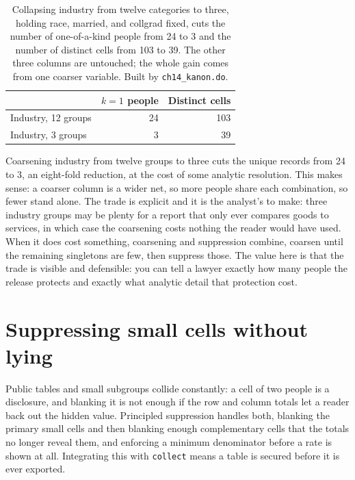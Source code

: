 \documentclass[
    a4paper,
    fontsize=10pt,
    twoside=true,
    numbers=noenddot,
]{kaobook}
\begin{document}
\begin{table}[htbp]
\centering
{\footnotesize
\begin{tabular}{lrr}
\hline
                       & $k=1$ people & Distinct cells \\
\hline
Industry, 12 groups    & 24 & 103 \\
Industry, 3 groups     &  3 &  39 \\
\hline
\end{tabular}
}
\caption[Coarsening industry collapses unique records]{Collapsing industry from twelve categories to three, holding race, married, and collgrad fixed, cuts the number of one-of-a-kind people from 24 to 3 and the number of distinct cells from 103 to 39. The other three columns are untouched; the whole gain comes from one coarser variable. Built by \texttt{ch14\_kanon.do}.}
\label{tab:coarsen}
\end{table}

Coarsening industry from twelve groups to three cuts the unique records from 24 to 3, an eight-fold reduction, at the cost of some analytic resolution. This makes sense: a coarser column is a wider net, so more people share each combination, so fewer stand alone. The trade is explicit and it is the analyst's to make: three industry groups may be plenty for a report that only ever compares goods to services, in which case the coarsening costs nothing the reader would have used. When it does cost something, coarsening and suppression combine, coarsen until the remaining singletons are few, then suppress those. The value here is that the trade is visible and defensible: you can tell a lawyer exactly how many people the release protects and exactly what analytic detail that protection cost.

\section{Suppressing small cells without lying}\label{sec:suppress}
Public tables and small subgroups collide constantly: a cell of two people is a disclosure, and blanking it is not enough if the row and column totals let a reader back out the hidden value. Principled suppression handles both, blanking the primary small cells and then blanking enough complementary cells that the totals no longer reveal them, and enforcing a minimum denominator before a rate is shown at all. Integrating this with \texttt{collect} means a table is secured before it is ever exported.
\end{document}
